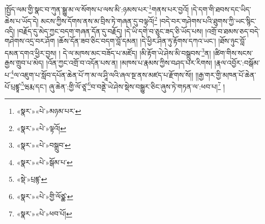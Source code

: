 །སྤྱོད་ལམ་གྱི་སྣང་བ་ཀུན་སྒྱུ་མ་ལ་སོགས་པ་ལས་མི་:ཉམས་པར་\footnote{«སྣར་»«པེ་»མཉམ་པར་}གནས་པར་བྱའོ། །དེ་དག་གི་ཐབས་དང་ཡིད་ཆེས་པ་ཡོད་དེ། མངས་ཀྱིས་དོགས་ནས་མ་བྲིས་ཏེ་གཞན་དུ་བལྟའོ།\footnote{«སྣར་»«པེ་»ལྟའོ།} །བདེ་བར་གཤེགས་པའི་ཐུགས་ཀྱི་ཡང་སྙིང་འདི། །བརྗོད་དུ་མེད་ཀྱང་བདག་གཞན་དོན་དུ་བརྗོད། །དེ་ཡི་དགེ་བ་ཅུང་ཟད་ཅི་ཡོད་པས། །འགྲོ་བ་ཐམས་ཅད་བདེ་གཤེགས་འདྲ་བར་ཤོག །ཆོས་དོན་ཟབ་ཅིང་བདག་བློ་དམན། །དེ་ཕྱིར་ཤིན་ཏུ་རྟོགས་དཀའ་ཡང་། །ཐོས་ཉུང་བློ་དམན་དགའ་ཕྱིར་བྱས། །
དེ་ལ་མཁས་མང་བཟོད་པ་མཛོད། །མི་རྟོག་ཡེ་ཤེས་མི་བསྒྲུབས་\footnote{«སྣར་»«པེ་»བསྒྲུབ་}ན། །ཚིག་གིས་སངས་རྒྱས་གྲུབ་པ་མེད། །འོན་ཀྱང་འགྲོ་བ་འདོན་པས་ན། །མཁས་པ་རྣམས་ཀྱིས་བཤད་པར་རིགས། །རྣལ་འབྱོར་:བསྒོམ་པ་\footnote{«སྣར་»«པེ་»སྒོམ་པ་}ལ་འཇུག་པ་སློབ་དཔོན་ཆེན་པོ་ཀ་མ་ལ་ཤཱི་ལའི་ཞལ་སྔ་ནས་མཛད་པ་རྫོགས་སོ།། །།རྒྱ་གར་གྱི་མཁན་པོ་ཆེན་པོ་པྲཛྙཱ་\footnote{«སྡེ་»པྲཛྙ་}ཝརྨ་དང་། ཞུ་ཆེན་:གྱི་ལོ་ཙཱ་\footnote{«སྣར་»«པེ་»གྱི་ལོཙྪ་}བ་བནྡེ་ཡེ་ཤེས་སྡེས་བསྒྱུར་ཅིང་ཞུས་ཏེ་གཏན་ལ་:ཕབ་པ།\footnote{«སྣར་»«པེ་»ཕབ་པོ།} །